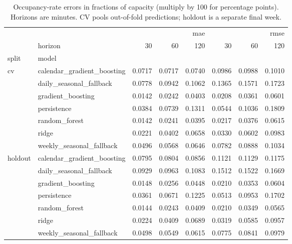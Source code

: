 \begin{table}
\caption{Occupancy-rate errors in fractions of capacity (multiply by 100 for percentage points). Horizons are minutes. CV pools out-of-fold predictions; holdout is a separate final week.}
\label{tab:parking_errors}
\begin{tabular}{llrrrrrr}
\toprule
 &  & \multicolumn{3}{r}{mae} & \multicolumn{3}{r}{rmse} \\
 & horizon & 30 & 60 & 120 & 30 & 60 & 120 \\
split & model &  &  &  &  &  &  \\
\midrule
\multirow[t]{7}{*}{cv} & calendar\_gradient\_boosting & 0.0717 & 0.0717 & 0.0740 & 0.0986 & 0.0988 & 0.1010 \\
 & daily\_seasonal\_fallback & 0.0778 & 0.0942 & 0.1062 & 0.1365 & 0.1571 & 0.1723 \\
 & gradient\_boosting & 0.0142 & 0.0242 & 0.0403 & 0.0208 & 0.0361 & 0.0601 \\
 & persistence & 0.0384 & 0.0739 & 0.1311 & 0.0544 & 0.1036 & 0.1809 \\
 & random\_forest & 0.0142 & 0.0241 & 0.0395 & 0.0217 & 0.0376 & 0.0615 \\
 & ridge & 0.0221 & 0.0402 & 0.0658 & 0.0330 & 0.0602 & 0.0983 \\
 & weekly\_seasonal\_fallback & 0.0496 & 0.0568 & 0.0646 & 0.0782 & 0.0888 & 0.1034 \\
\cline{1-8}
\multirow[t]{7}{*}{holdout} & calendar\_gradient\_boosting & 0.0795 & 0.0804 & 0.0856 & 0.1121 & 0.1129 & 0.1175 \\
 & daily\_seasonal\_fallback & 0.0929 & 0.0963 & 0.1083 & 0.1512 & 0.1522 & 0.1669 \\
 & gradient\_boosting & 0.0148 & 0.0256 & 0.0448 & 0.0210 & 0.0353 & 0.0604 \\
 & persistence & 0.0361 & 0.0671 & 0.1225 & 0.0513 & 0.0953 & 0.1702 \\
 & random\_forest & 0.0144 & 0.0243 & 0.0409 & 0.0210 & 0.0349 & 0.0565 \\
 & ridge & 0.0224 & 0.0409 & 0.0689 & 0.0319 & 0.0585 & 0.0957 \\
 & weekly\_seasonal\_fallback & 0.0498 & 0.0549 & 0.0615 & 0.0775 & 0.0841 & 0.0979 \\
\cline{1-8}
\bottomrule
\end{tabular}
\end{table}
